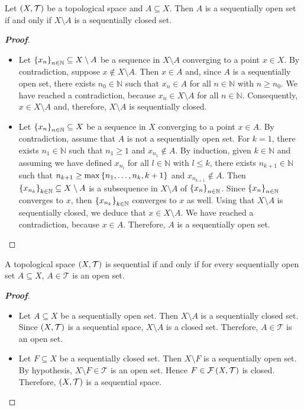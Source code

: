 \begin{proposition}
  Let $\left(X,\mathcal{T}\right)$ be a topological space and $A\subseteq X$. Then $A$ is a sequentially open set if and only if $X\setminus A$ is a sequentially closed set.
  \begin{proof}[\rm\textbf{Proof}]
    \hfill
    \begin{itemize}
      \item[\boxed{\Rightarrow}] Let $\left\{x_n\right\}_{n\in\mathbb{N}}\subseteq X\setminus A$ be a sequence in $X\setminus A$ converging to a point $x\in X$. By contradiction, suppose $x\notin X\setminus A$. Then $x\in A$ and, since $A$ is a sequentially open set, there exists $n_0\in\mathbb{N}$ such that $x_n\in A$ for all $n\in\mathbb{N}$ with $n\geq n_0$. We have reached a contradiction, because $x_n\in X\setminus A$ for all $n\in\mathbb{N}$. Consequently, $x\in X\setminus A$ and, therefore, $X\setminus A$ is sequentially closed.
      \item[\boxed{\Leftarrow}] Let $\left\{x_n\right\}_{n\in\mathbb{N}}\subseteq X$ be a sequence in $X$ converging to a point $x\in A$. By contradiction, assume that $A$ is not a sequentially open set. For $k=1$, there exists $n_1\in\mathbb{N}$ such that $n_1\geq 1$ and $x_{n_1}\notin A$. By induction, given $k\in\mathbb{N}$ and assuming we have defined $x_{n_l}$ for all $l\in\mathbb{N}$ with $l\leq k$, there exists $n_{k+1}\in\mathbb{N}$ such that $n_{k+1}\geq\max\left\{n_1,\dots,n_k, k+1\right\}$ and $x_{n_{k+1}}\notin A$. Then $\left\{x_{n_k}\right\}_{k\in\mathbb{N}}\subseteq X\setminus A$ is a subsequence in $X\setminus A$ of $\left\{x_n\right\}_{n\in\mathbb{N}}$. Since $\left\{x_n\right\}_{n\in\mathbb{N}}$ converges to $x$, then $\left\{x_{n_k}\right\}_{k\in\mathbb{N}}$ converges to $x$ as well. Using that $X\setminus A$ is sequentially closed, we deduce that $x\in X\setminus A$. We have reached a contradiction, because $x\in A$. Therefore, $A$ is a sequentially open set.
    \end{itemize}
  \end{proof}
\end{proposition}

\begin{proposition}
  A topological space $\left(X,\mathcal{T}\right)$ is sequential if and only if for every sequentially open set $A\subseteq X$, $A\in\mathcal{T}$ is an open set.
  \begin{proof}[\rm\textbf{Proof}]
    \hfill
    \begin{itemize}
      \item[\boxed{\Rightarrow}] Let $A\subseteq X$ be a sequentially open set. Then $X\setminus A$ is a sequentially closed set. Since $\left(X,\mathcal{T}\right)$ is a sequential space, $X\setminus A$ is a closed set. Therefore, $A\in\mathcal{T}$ is an open set.
      \item[\boxed{\Leftarrow}] Let $F\subseteq X$ be a sequentially closed set. Then $X\setminus F$ is a sequentially open set. By hypothesis, $X\setminus F\in\mathcal{T}$ is an open set. Hence $F\in\mathcal{F}\left(X,\mathcal{T}\right)$ is closed. Therefore, $\left(X,\mathcal{T}\right)$ is a sequential space.
    \end{itemize}
  \end{proof}
\end{proposition}

